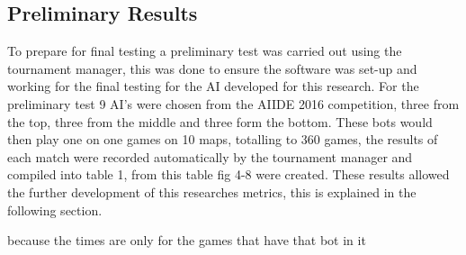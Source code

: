 \documentclass[journal]{IEEEtran}
\begin{document}
\subsection{Preliminary Results}
To prepare for final testing a preliminary test was carried out using the tournament manager, this was done to ensure the software was set-up and working for the final testing for the AI developed for this research. For the preliminary test 9 AI's were chosen from the AIIDE 2016 competition, three from the top, three from the middle and three form the bottom. These bots would then play one on one games on 10 maps, totalling to 360 games, the results of each match were recorded automatically by the tournament manager and compiled into table 1, from this table fig 4-8 were created. These results allowed the further development of this researches metrics, this is explained in the following section.

because the times are only for the games that have that bot in it
\end{document}
